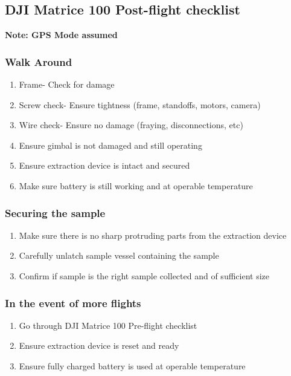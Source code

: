 \clearpage
\subsection{DJI Matrice 100 Post-flight checklist}
\textbf{Note: GPS Mode assumed}

\subsubsection{Walk Around}
\begin{enumerate}
\setlength{\itemsep}{0em}
\setlength{\parskip}{0em}
\item Frame- Check for damage 
\item Screw check- Ensure tightness (frame, standoffs, motors, camera)
\item Wire check- Ensure no damage (fraying, disconnections, etc)
\item Ensure gimbal is not damaged and still operating
\item Ensure extraction device is intact and secured
\item Make sure battery is still working and at operable temperature
\end{enumerate}

\subsubsection{Securing the sample}
\begin{enumerate}
\setlength{\itemsep}{0em}
\setlength{\parskip}{0em}
\item Make sure there is no sharp protruding parts from the extraction device
\item Carefully unlatch sample vessel containing the sample
\item Confirm if sample is the right sample collected and of sufficient size
\end{enumerate}

\subsubsection{In the event of more flights}
\begin{enumerate}
\setlength{\itemsep}{0em}
\setlength{\parskip}{0em}
\item Go through DJI Matrice 100 Pre-flight checklist
\item Ensure extraction device is reset and ready
\item Ensure fully charged battery is used at operable temperature
\end{enumerate}

